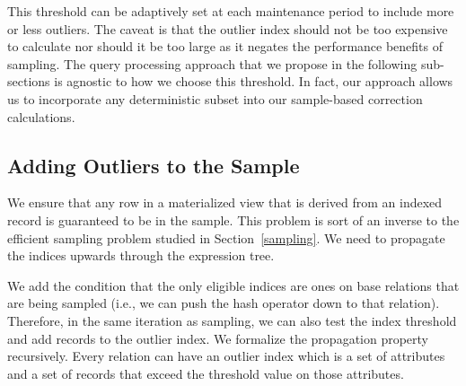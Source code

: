 This threshold can be adaptively set at each maintenance period to include more or less outliers.
The caveat is that the outlier index should not be too expensive to calculate nor should it be too large as it negates the performance benefits of sampling.  
The query processing approach that we propose in the following sub-sections is agnostic to how we choose this threshold.
In fact, our approach allows us to incorporate any deterministic subset into our sample-based correction calculations.

\subsection{Adding Outliers to the Sample}
We ensure that any row in a materialized view that is derived from an indexed record is guaranteed to be in the sample.
This problem is sort of an inverse to the efficient sampling problem studied in Section~\ref{sampling}.
We need to propagate the indices upwards through the expression tree.

We add the condition that the only eligible indices are ones on base relations that are being sampled (i.e., we can push the hash operator down to that relation).
Therefore, in the same iteration as sampling, we can also test the index threshold and add records to the outlier index. 
We formalize the propagation property recursively. 
Every relation can have an outlier index which is a set of attributes and a set of records that exceed the threshold value on those attributes.

